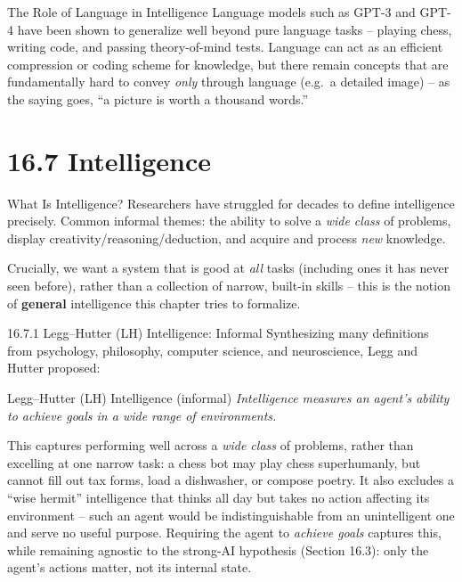 \documentclass[aspectratio=169,10pt]{beamer}
\begin{document}
\begin{frame}{The Role of Language in Intelligence}
  Language models such as GPT-3 and GPT-4 have been shown to generalize
  well beyond pure language tasks -- playing chess, writing code, and
  passing theory-of-mind tests. Language can act as an efficient compression
  or coding scheme for knowledge, but there remain concepts that are
  fundamentally hard to convey \emph{only} through language (e.g.\ a
  detailed image) -- as the saying goes, ``a picture is worth a thousand
  words.''
\end{frame}

\section{16.7 Intelligence}

\begin{frame}{What Is Intelligence?}
  Researchers have struggled for decades to define intelligence precisely.
  Common informal themes: the ability to solve a \emph{wide class} of
  problems, display creativity/reasoning/deduction, and acquire and process
  \emph{new} knowledge.

  \vspace{0.3em}
  Crucially, we want a system that is good at \emph{all} tasks (including
  ones it has never seen before), rather than a collection of narrow,
  built-in skills -- this is the notion of \textbf{general} intelligence
  this chapter tries to formalize.
\end{frame}

\begin{frame}{16.7.1 Legg--Hutter (LH) Intelligence: Informal}
  Synthesizing many definitions from psychology, philosophy, computer
  science, and neuroscience, Legg and Hutter proposed:

  \begin{block}{Legg--Hutter (LH) Intelligence (informal)}
    \emph{Intelligence measures an agent's ability to achieve goals in a
    wide range of environments.}
  \end{block}

  This captures performing well across a \emph{wide class} of problems,
  rather than excelling at one narrow task: a chess bot may play chess
  superhumanly, but cannot fill out tax forms, load a dishwasher, or
  compose poetry. It also excludes a ``wise hermit'' intelligence that
  thinks all day but takes no action affecting its environment -- such an
  agent would be indistinguishable from an unintelligent one and serve no
  useful purpose. Requiring the agent to \emph{achieve goals} captures this,
  while remaining agnostic to the strong-AI hypothesis (Section 16.3):
  only the agent's actions matter, not its internal state.
\end{frame}
\end{document}
